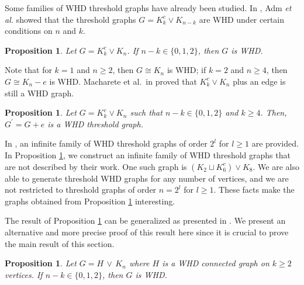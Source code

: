 \documentclass[preprint]{elsarticle}
\newtheorem{proposition}[theorem]{Proposition}
\begin{document}
Some families of WHD threshold graphs have already been studied. In \cite{WHD}, Adm \emph{et al.} showed that the threshold graphs $G=K_k^c\vee K_{n-k}$ are WHD under certain conditions on $n$ and $k$. 

\begin{proposition}
\label{heberk>3}
Let $G=K_k^c\vee K_{n}$.  If $n-k \in \{0, 1, 2\}$, then $G$ is WHD.
\end{proposition}

Note that for $k=1$ and $n\geq 2$, then $G \cong K_{n}$ is WHD; if $k=2$ and $n\geq 4$, then $G \cong K_{n} - e$ is WHD.  Macharete et al.\ in \cite[Propositions 4.1 and 4.2]{MDTL24} proved that $K_{k}^{c} \vee K_{n}$ plus an edge is still a WHD graph.

\begin{proposition}\label{heberG+e}
    Let $G=K_k^c\vee K_{n}$ such that $n-k \in \{0, 1, 2\}$ and $k\geq 4$. Then, $G^{\prime} = G+e$ is a WHD threshold graph.
\end{proposition}

In \cite{WeakMatrices}, an infinite family of WHD threshold graphs of order $2^{l}$ for $l\geq 1$ are provided. In Proposition \ref{heberG+e}, we construct an infinite family of WHD threshold graphs that are not described by their work. One such graph is $(K_2 \sqcup K_{6}^c) \vee K_8$. We are also able to generate threshold WHD graphs for any number of vertices, and we are not restricted to threshold graphs of order $n = 2^{l}$ for $l \geq 1.$ These facts make the graphs obtained from Proposition \ref{heberG+e} interesting. 

The result of Proposition \ref{heberG+e} can be generalized as presented in \cite{WHD}. We present an alternative and more precise proof of this result here since it is crucial to prove the main result of this section.  

\begin{proposition}\label{HjoinKn}
Let $G=H \, \vee \, K_{n}$ where $H$ is a WHD connected graph on $k\geq 2$ vertices. If $n-k \in \{0, 1, 2\}$, then $G$ is WHD.
\end{proposition}
\end{document}
